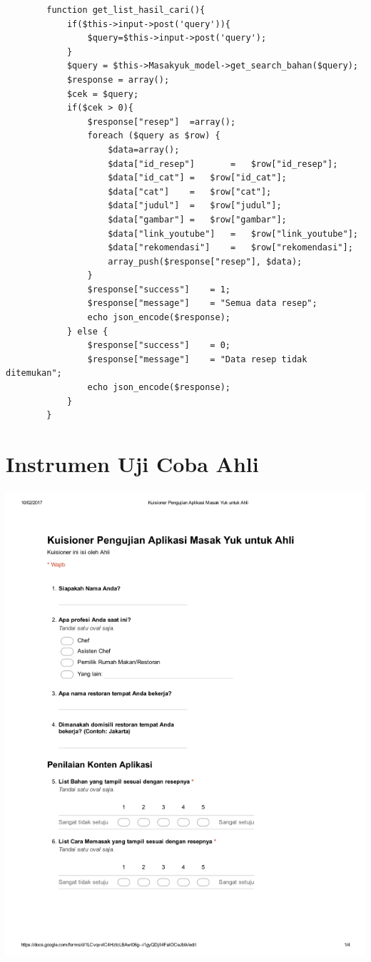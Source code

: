 \begin{verbatim}
		function get_list_hasil_cari(){
			if($this->input->post('query')){
				$query=$this->input->post('query');
			}
			$query = $this->Masakyuk_model->get_search_bahan($query);
			$response = array();
			$cek = $query;
			if($cek > 0){
				$response["resep"]	=array();
				foreach ($query as $row) {
					$data=array();
					$data["id_resep"]		=	$row["id_resep"];
					$data["id_cat"]	=	$row["id_cat"];
					$data["cat"]	=	$row["cat"];
					$data["judul"]	=	$row["judul"];
					$data["gambar"]	=	$row["gambar"];
					$data["link_youtube"]	=	$row["link_youtube"];
					$data["rekomendasi"]	=	$row["rekomendasi"];
					array_push($response["resep"], $data);
				}
				$response["success"]	= 1;
				$response["message"]	= "Semua data resep";
				echo json_encode($response);
			} else {
				$response["success"]	= 0;
				$response["message"]	= "Data resep tidak ditemukan";
				echo json_encode($response);
			}
		}		
	\end{verbatim}	

\chapter{Instrumen Uji Coba Ahli}
\includegraphics[width=1\textwidth]{pdf/uji_ahli_hal_1}


